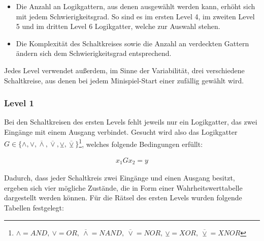 \begin{itemize}
    \item Die Anzahl an Logikgattern, aus denen ausgewählt werden kann, erhöht sich mit jedem Schwierigkeitsgrad.
            So sind es im ersten Level 4, im zweiten Level 5 und im dritten Level 6 Logikgatter, welche zur Auswahl stehen.
    \item Die Komplexität des Schaltkreises sowie die Anzahl an verdeckten Gattern ändern sich dem Schwierigkeitsgrad entsprechend.
\end{itemize}

Jedes Level verwendet außerdem, im Sinne der Variabilität, drei verschiedene Schaltkreise, aus denen bei jedem Minispiel-Start einer zufällig gewählt wird.

\subsubsection{Level 1}

Bei den Schaltkreisen des ersten Levels fehlt jeweils nur ein Logikgatter, das zwei Eingänge mit einem Ausgang verbindet.
Gesucht wird also das Logikgatter $G \in \{\land , \lor , \overline{\land}, \overline{\lor}, \veebar, \overline{\veebar}\}$\footnote{$\land = AND,\ \lor = OR,\ \overline{\land} = NAND,\ \overline{\lor} = NOR,\ \veebar = XOR,\ \overline{\veebar} = XNOR$}, welches folgende Bedingungen erfüllt:

\begin{align*}
    x_1 G x_2 = y
\end{align*}

Dadurch, dass jeder Schaltkreis zwei Eingänge und einen Ausgang besitzt, ergeben sich vier mögliche Zustände, die in Form einer Wahrheitswerttabelle dargestellt werden können.
Für die Rätsel des ersten Levels wurden folgende Tabellen festgelegt:


